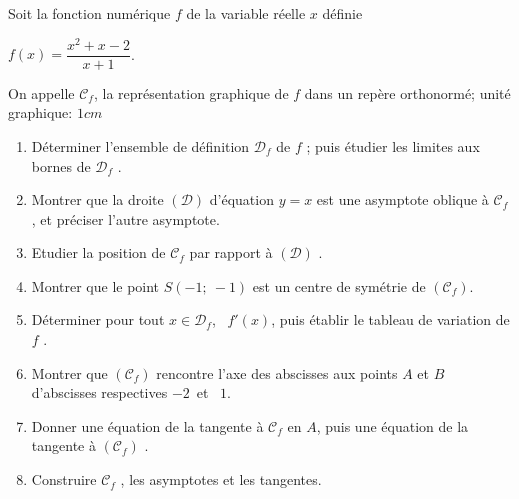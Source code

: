 \begin{exercice} 
Soit la fonction num\'erique $ f $ de la variable r\'eelle $x$ d\'efinie 

$f(x)=\dfrac{x^2+x-2}{x+1}$.\medskip

On appelle $\mathscr{C}_f$, la repr\'esentation graphique de $f$ dans un rep\`ere orthonorm\'e; unit\'e graphique: $1cm$
\begin{enumerate}
 \item D\'eterminer l'ensemble de d\'efinition $\mathscr{D}_f$ de $f$ ; puis \'etudier les limites aux bornes de 
 $\mathscr{D}_f$ .
 \item Montrer que la droite  $(\mathcal{D})$ d'\'equation $y=x$ est une asymptote oblique \`a $\mathscr{C}_f$, et 
 pr\'eciser l'autre asymptote.
 \item Etudier la position de $\mathscr{C}_f$ par rapport  \`a $(\mathcal{D})$ .
 \item Montrer que le point $S(-1;~-1)$ est un centre de sym\'etrie de $(\mathscr{C}_f)$.
 \item D\'eterminer pour tout $x\in \mathscr{D}_f$, ~$f'(x)$, puis \'etablir le tableau de variation de $f$ .
 \item Montrer que $(\mathscr{C}_f)$ rencontre l'axe des abscisses aux points $A$ et $B$ d'abscisses respectives\;
 $-2$~et~ $1$.
 \item Donner une \'equation de la tangente \`a $\mathscr{C}_f$ en $A$, puis une \'equation de la tangente \`a 
 $(\mathscr{C}_f)$ .
 \item Construire $\mathscr{C}_f$ , les asymptotes et les tangentes.
\end{enumerate}
\end{exercice}


